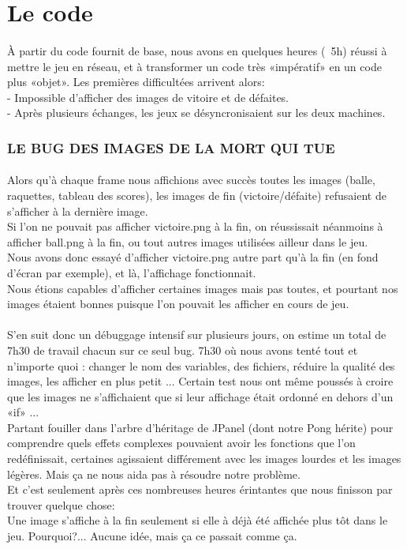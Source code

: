 \documentclass[a4paper, 12pt]{scrreprt}
\begin{document}
\section*{Le code}
\paragraph{}
À partir du code fournit de base, nous avons en quelques heures (~5h) réussi à mettre le jeu en réseau, et à transformer un code très «impératif» en un code plus «objet».
Les premières difficultées arrivent alors:
\\- Impossible d'afficher des images de vitoire et de défaites.
\\- Après plusieurs échanges, les jeux se désyncronisaient sur les deux machines.
\subsubsection*{LE BUG DES IMAGES DE LA MORT QUI TUE}
\paragraph{}
Alors qu'à chaque frame nous affichions avec succès toutes les images (balle, raquettes, tableau des scores), les images de fin (victoire/défaite) refusaient de s'afficher à la dernière image.
\\Si l'on ne pouvait pas afficher victoire.png à la fin, on réussissait néanmoins à afficher ball.png à la fin, ou tout autres images utilisées ailleur dans le jeu.
\\Nous avons donc essayé d'afficher victoire.png autre part qu'à la fin (en fond d'écran par exemple), et là, l'affichage fonctionnait.
\\Nous étions capables d'afficher certaines images mais pas toutes, et pourtant nos images étaient bonnes puisque l'on pouvait les afficher en cours de jeu.
\paragraph{}
S'en suit donc un débuggage intensif sur plusieurs jours, on estime un total de 7h30 de travail chacun sur ce seul bug. 7h30 où nous avons tenté tout et n'importe quoi : changer le nom des variables, des fichiers, réduire la qualité des images, les afficher en plus petit ... Certain test nous ont même poussés à croire que les images ne s'affichaient que si leur affichage était ordonné en dehors d'un «if» ...
\\Partant fouiller dans l'arbre d'héritage de JPanel (dont notre Pong hérite) pour comprendre quels effets complexes pouvaient avoir les fonctions que l'on redéfinissait, certaines agissaient différement avec les images lourdes et les images légères. Mais ça ne nous aida pas à résoudre notre problème.
\\Et c'est seulement après ces nombreuses heures érintantes que nous finisson par trouver quelque chose:
\\Une image s'affiche à la fin seulement si elle à déjà été affichée plus tôt dans le jeu. Pourquoi?... Aucune idée, mais ça ce passait comme ça.
\end{document}
